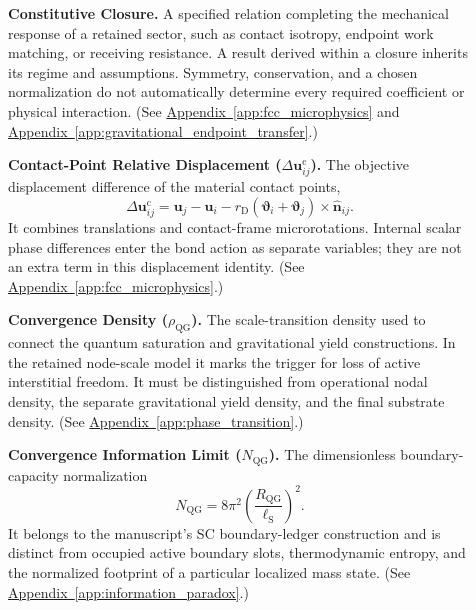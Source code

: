 \begin{description}
\item[] \begin{minipage}[t]{\linewidth}
\textbf{Constitutive Closure.} A specified relation completing the mechanical response of a retained sector, such as contact isotropy, endpoint work matching, or receiving resistance. A result derived within a closure inherits its regime and assumptions. Symmetry, conservation, and a chosen normalization do not automatically determine every required coefficient or physical interaction.
(See \hyperref[app:fcc_microphysics]{Appendix~\ref*{app:fcc_microphysics}} and \hyperref[app:gravitational_endpoint_transfer]{Appendix~\ref*{app:gravitational_endpoint_transfer}}.)
\end{minipage}

\item[] \begin{minipage}[t]{\linewidth}
\textbf{Contact-Point Relative Displacement ($\Delta\mathbf u_{ij}^{\mathrm c}$).} The objective displacement difference of the material contact points,
\[
 \Delta\mathbf u_{ij}^{\mathrm c}
 =\mathbf u_j-\mathbf u_i
 -r_{\mathrm D}(\boldsymbol\vartheta_i+\boldsymbol\vartheta_j)
       \times\hat{\mathbf n}_{ij}.
\]
It combines translations and contact-frame microrotations. Internal scalar phase differences enter the bond action as separate variables; they are not an extra term in this displacement identity.
(See \hyperref[app:fcc_microphysics]{Appendix~\ref*{app:fcc_microphysics}}.)
\end{minipage}

\item[] \begin{minipage}[t]{\linewidth}
\textbf{Convergence Density ($\rho_{\mathrm{QG}}$).} The scale-transition density used to connect the quantum saturation and gravitational yield constructions. In the retained node-scale model it marks the trigger for loss of active interstitial freedom. It must be distinguished from operational nodal density, the separate gravitational yield density, and the final substrate density.
(See \hyperref[app:phase_transition]{Appendix~\ref*{app:phase_transition}}.)
\end{minipage}

\item[] \begin{minipage}[t]{\linewidth}
\textbf{Convergence Information Limit ($N_{\mathrm{QG}}$).} The dimensionless boundary-capacity normalization
\[
 N_{\mathrm{QG}}=8\pi^2
       \left(\frac{R_{\mathrm{QG}}}{\ell_{\mathrm S}}\right)^2.
\]
It belongs to the manuscript's SC boundary-ledger construction and is distinct from occupied active boundary slots, thermodynamic entropy, and the normalized footprint of a particular localized mass state.
(See \hyperref[app:information_paradox]{Appendix~\ref*{app:information_paradox}}.)
\end{minipage}


\end{description}
